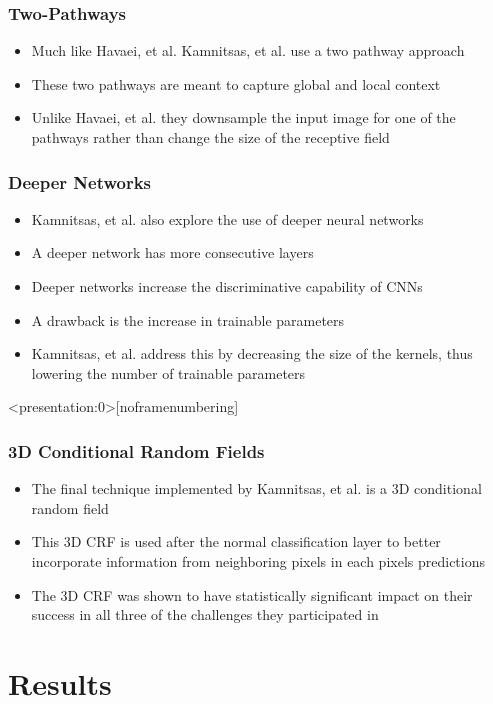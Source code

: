 \documentclass{beamer}
\begin{document}
\begin{frame}
  \frametitle{Two-Pathways}
  \begin{itemize}
	\item Much like Havaei, et al. Kamnitsas, et al. use a two pathway approach
	\item These two pathways are meant to capture global and local context
	\item Unlike Havaei, et al. they downsample the input image for one of the pathways rather than change the size of the receptive field
  \end{itemize}
\end{frame}

\begin{frame}
  \frametitle{Deeper Networks}
  \begin{itemize}
	\item Kamnitsas, et al. also explore the use of deeper neural networks
	\item A deeper network has more consecutive layers
	\item Deeper networks increase the discriminative capability of CNNs
	\item A drawback is the increase in trainable parameters
	\item Kamnitsas, et al. address this by decreasing the size of the kernels, thus lowering the number of trainable parameters
  \end{itemize}
\end{frame}

\begin{frame}<presentation:0>[noframenumbering]
  \frametitle{3D Conditional Random Fields}
  \begin{itemize}
	\item The final technique implemented by Kamnitsas, et al. is a 3D conditional random field
	\item This 3D CRF is used after the normal classification layer to better incorporate information from neighboring pixels in each pixels predictions
	\item The 3D CRF was shown to have statistically significant impact on their success in all three of the challenges they participated in
  \end{itemize}
\end{frame}

\section*{Results}
\end{document}
